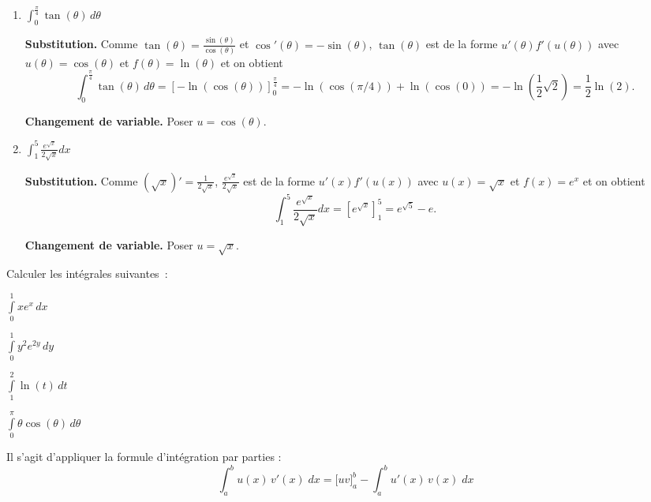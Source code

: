 \documentclass[11pt,class=report,crop=false]{standalone}
\begin{document}
\begin{enumerate}
	\item $\int  _{0} ^{\frac{\pi}{4}} \tan(\theta) \,d\theta$
	
    \textbf{Substitution.}
	Comme $ \tan(\theta) = \frac{\sin(\theta)}{\cos(\theta)} $ et $ \cos'(\theta) 
	= -\sin(\theta) $, $ \tan(\theta) $ est de la forme $ u'(\theta) f'(u(\theta)) $ 
	avec $ u(\theta) = \cos(\theta) $ et $ f(\theta) = \ln(\theta) $ et on obtient 
	\begin{equation*} 
		\int  _{0} ^{\frac{\pi}{4}} \tan(\theta) \,d\theta = 
		\left[-\ln(\cos(\theta))\right]_0^\frac{\pi}{4} = 
		-\ln(\cos(\pi/4)) + \ln(\cos(0)) = 
		-\ln\left(\frac{1}{2} \sqrt{2}\right) = 
		\frac{1}{2} \ln(2). 
	\end{equation*} 
	
	\textbf{Changement de variable.} Poser $u=\cos(\theta)$.
	
	\item $\int  _{1} ^{5} \frac{e^{\sqrt{x}}}{2\sqrt{x}}dx$
	
    \textbf{Substitution.}
	Comme $ (\sqrt{x})' = \frac{1}{2 \sqrt{x}} $, $ \frac{e^{\sqrt{x}}}{2\sqrt{x}} $ 
	est de la forme $ u'(x) f'(u(x)) $ avec $ u(x) = \sqrt{x} $ et $ f(x) = e^{x} $ 
	et on obtient 
	\begin{equation*} 
		\int  _{1} ^{5} \frac{e^{\sqrt{x}}}{2\sqrt{x}}dx = 
		\left[e^{\sqrt{x}}\right]_1^5 = 
		e^{\sqrt{5}} - e. 
	\end{equation*} 
	
	\textbf{Changement de variable.} Poser $u=\sqrt{x}$.	
\end{enumerate} 
\fincorrection
\finexercice


\exercice{}
\enonce
Calculer les intégrales suivantes~:
    \begin{examplescol}{4}
		\item $\int \limits _{0} ^{1} xe^{x}\,dx$ 
		\item $\int \limits _{0} ^{1} y^{2}e^{2y} \,dy$
		\item $\int \limits _{1} ^{2} \ln(t) \,dt$  
		\item $\int \limits _{0} ^{\pi} \theta \cos(\theta) \,d\theta$
    \end{examplescol}
\finenonce

\indication
Il s'agit d'appliquer la formule d'intégration par parties :
$$\int_a^b u(x) \, v'(x)\;dx= \big[uv\big]_a^b - \int_a^b u'(x) \, v(x)\;dx$$

\finindication

\correction
\end{document}
